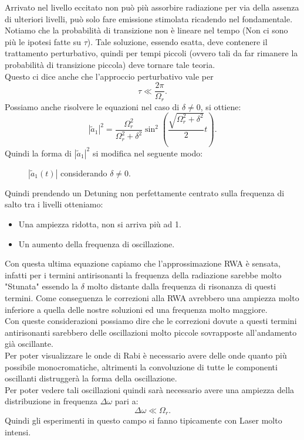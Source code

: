 Arrivato nel livello eccitato non può più assorbire radiazione per via della assenza di ulteriori livelli, può solo fare emissione stimolata ricadendo nel fondamentale.\\
Notiamo che la probabilità di transizione non è lineare nel tempo (Non ci sono più le ipotesi fatte su $\tau$).
Tale soluzione, essendo esatta, deve contenere il trattamento perturbativo, quindi per tempi piccoli (ovvero tali da far rimanere la probabilità di transizione piccola) deve tornare tale teoria. \\
Questo ci dice anche che l'approccio perturbativo vale per 
\[
\tau \ll \frac{2\pi}{\Omega_r}
.\] 
Possiamo anche risolvere le equazioni nel caso di $\delta \neq 0$, si ottiene:
\[
\left|\tilde{a}_1\right|^2= \frac{\Omega^2_r}{\Omega_r^2+\delta^2}
\sin^2\left(\frac{\sqrt{\Omega^2_r + \delta^2}}{2}t\right)
.\] 
Quindi la forma di $\left|\tilde{a}_1\right|^2$ si modifica nel seguente modo:
\begin{figure}[H]
    \centering
    \caption{$\left|\tilde{a}_1(t)\right|$ considerando $\delta\neq 0$.}
    \label{delta non nullo}
\end{figure}
\noindent
Quindi prendendo un Detuning non perfettamente centrato sulla frequenza di salto tra i livelli otteniamo:
\begin{itemize}
    \item Una ampiezza ridotta, non si arriva più ad 1.
    \item Un aumento della frequenza di oscillazione.
\end{itemize}
Con questa ultima equazione capiamo che l'approssimazione RWA è sensata, infatti per i termini antirisonanti la frequenza della radiazione sarebbe molto "Stunata" essendo la $\delta$ molto distante dalla frequenza di risonanza di questi termini. Come conseguenza le correzioni alla RWA avrebbero una ampiezza molto inferiore a quella delle nostre soluzioni ed una frequenza molto maggiore.\\
Con queste considerazioni possiamo dire che le correzioni dovute a questi termini antirisonanti sarebbero delle oscillazioni molto piccole sovrapposte all'andamento già oscillante. \\
Per poter visualizzare le onde di Rabi è necessario avere delle onde quanto più possibile monocromatiche, altrimenti la convoluzione di tutte le componenti oscillanti distruggerà la forma della oscillazione. \\
Per poter vedere tali oscillazioni quindi sarà necessario avere una ampiezza della distribuzione in frequenza $\Delta\omega$ pari a:
\[
\Delta\omega\ll\Omega_r
.\] 
Quindi gli esperimenti in questo campo si fanno tipicamente con Laser molto intensi.

